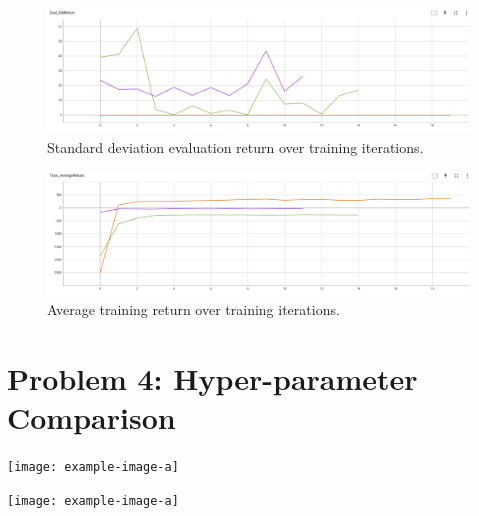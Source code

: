 \documentclass{article}
\begin{document}
\begin{answer}[title=Plot,height=9.5cm,width=\linewidth]
    \begin{figure}[H]
        \centering
        \includegraphics[width=.99\linewidth]{figs/P3_2.png}
        \caption{Standard deviation evaluation return over training iterations. \\
            \color{orange}{Orange: cheetah.}
            \color{violet}{Purple: obstacles.}
            \color{green}{Green: reacher.}}
    \end{figure}
\end{answer}

\begin{answer}[title=Plot,height=9.5cm,width=\linewidth]
    \begin{figure}[H]
        \centering
        \includegraphics[width=.99\linewidth]{figs/P3_3.png}
        \caption{Average training return over training iterations. \\
            \color{orange}{Orange: cheetah.}
            \color{violet}{Purple: obstacles.}
            \color{green}{Green: reacher.}}
    \end{figure}
\end{answer}

\section{Problem 4: Hyper-parameter Comparison}
\begin{answer}[title=Plot,height=9.5cm,width=\linewidth]
    \centering
    \texttt{[image: example-image-a]}
\end{answer}

\begin{answer}[title=Plot,height=9.5cm,width=\linewidth]
    \centering
    \texttt{[image: example-image-a]}
\end{answer}
\end{document}
